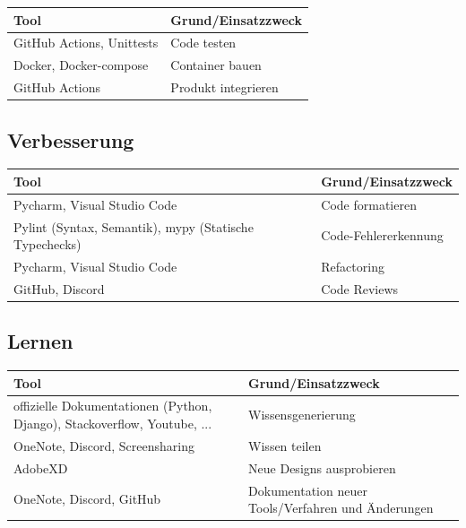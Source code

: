 \documentclass[a4paper,11pt]{scrartcl}
\begin{document}
\begin{table}[H]
\begin{center}
\begin{tabular}{|L{4cm}|L{8cm}|}
\hline
\textbf{Tool} &\textbf{Grund/Einsatzzweck} \\ \hline
GitHub Actions, Unittests & Code testen \\ \hline
Docker, Docker-compose & Container bauen\\ \hline
GitHub Actions & Produkt integrieren\\ \hline
\end{tabular}
\end{center}
\end{table}
 
\subsection{Verbesserung}

\begin{table}[H]
\begin{center}
\begin{tabular}{|L{4cm}|L{8cm}|}
\hline
\textbf{Tool} &\textbf{Grund/Einsatzzweck} \\ \hline
Pycharm, Visual Studio Code & Code formatieren\\ \hline
Pylint (Syntax, Semantik), mypy (Statische Typechecks) &  Code-Fehlererkennung\\ \hline
Pycharm, Visual Studio Code & Refactoring\\ \hline
GitHub, Discord & Code Reviews\\ \hline
\end{tabular}
\end{center}
\end{table}

\subsection{Lernen}

\begin{table}[H]
\begin{center}
\begin{tabular}{|L{4cm}|L{8cm}|}
\hline
\textbf{Tool} &\textbf{Grund/Einsatzzweck} \\ \hline
offizielle Dokumentationen (Python, Django), Stackoverflow, Youtube, ... & Wissensgenerierung\\ \hline
OneNote, Discord, Screensharing & Wissen teilen\\ \hline
AdobeXD & Neue Designs ausprobieren\\ \hline
OneNote, Discord, GitHub & Dokumentation neuer Tools/Verfahren und Änderungen\\ \hline
\end{tabular}
\end{center}
\end{table}
\end{document}

